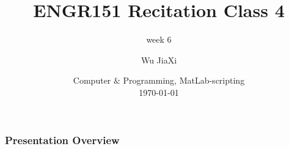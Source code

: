 \documentclass[
	11pt, %
]{beamer}
\title[Computer \& Programming, MATLAB]{ENGR151 Recitation Class 4} %
\subtitle{week 6} %
\author[Wu JiaXi]{Wu JiaXi} %
\institute[UM-SJTU joint institute]{UM-SJTU joint institute \\ \smallskip \textit{nina$\_$nhk@sjtu.edu.cn}} %
\date[\today]{Computer $\&$ Programming, MatLab-scripting \\ \today} %
\begin{document}

\begin{frame}
	\titlepage %
\end{frame}



\begin{frame}
	\frametitle{Presentation Overview} %
	
	\tableofcontents %
\end{frame}



    
\end{document}
